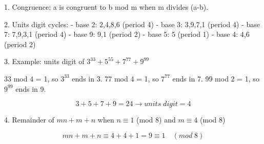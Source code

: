 1. Congruence: a is congruent to b mod m when m divides (a-b).

2. Units digit cycles:
- base 2: 2,4,8,6 (period 4)
- base 3: 3,9,7,1 (period 4)
- base 7: 7,9,3,1 (period 4)
- base 9: 9,1 (period 2)
- base 5: 5 (period 1)
- base 4: 4,6 (period 2)

3. Example: units digit of $3^{33} + 5^{55} + 7^{77} + 9^{99}$

33 mod 4 = 1, so $3^{33}$ ends in 3.
77 mod 4 = 1, so $7^{77}$ ends in 7.
99 mod 2 = 1, so $9^{99}$ ends in 9.

$$ 3+5+7+9=24 \rightarrow units \; digit = 4 $$

4. Remainder of $mn+m+n$ when $n \equiv 1$ (mod 8) and $m \equiv 4$ (mod 8)

$$ mn+m+n \equiv 4+4+1=9 \equiv 1 \quad (mod \; 8) $$
